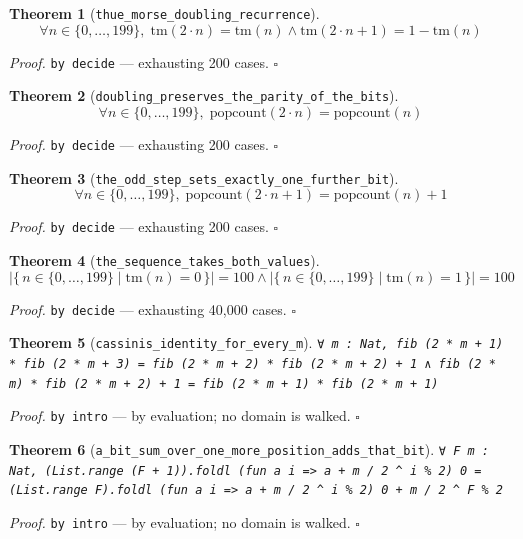\documentclass[11pt]{article}
\newtheorem{theorem}{Theorem}[section]
\begin{document}
\begin{theorem}[\texttt{thue\_morse\_doubling\_recurrence}]
\[ \forall n \in \{0,\dots,199\},\; \mathrm{tm}\mathopen{}\left(2 \cdot n\right) = \mathrm{tm}\mathopen{}\left(n\right) \land \mathrm{tm}\mathopen{}\left(2 \cdot n + 1\right) = 1 - \mathrm{tm}\mathopen{}\left(n\right) \]
\end{theorem}
\noindent\emph{Proof.} \texttt{by decide} --- exhausting 200 cases. \hfill$\square$

\begin{theorem}[\texttt{doubling\_preserves\_the\_parity\_of\_the\_bits}]
\[ \forall n \in \{0,\dots,199\},\; \mathrm{popcount}\mathopen{}\left(2 \cdot n\right) = \mathrm{popcount}\mathopen{}\left(n\right) \]
\end{theorem}
\noindent\emph{Proof.} \texttt{by decide} --- exhausting 200 cases. \hfill$\square$

\begin{theorem}[\texttt{the\_odd\_step\_sets\_exactly\_one\_further\_bit}]
\[ \forall n \in \{0,\dots,199\},\; \mathrm{popcount}\mathopen{}\left(2 \cdot n + 1\right) = \mathrm{popcount}\mathopen{}\left(n\right) + 1 \]
\end{theorem}
\noindent\emph{Proof.} \texttt{by decide} --- exhausting 200 cases. \hfill$\square$

\begin{theorem}[\texttt{the\_sequence\_takes\_both\_values}]
\[ \left|\{\, n \in \{0,\dots,199\} \mid \mathrm{tm}\mathopen{}\left(n\right) = 0 \,\}\right| = 100 \land \left|\{\, n \in \{0,\dots,199\} \mid \mathrm{tm}\mathopen{}\left(n\right) = 1 \,\}\right| = 100 \]
\end{theorem}
\noindent\emph{Proof.} \texttt{by decide} --- exhausting 40,000 cases. \hfill$\square$

\begin{theorem}[\texttt{cassinis\_identity\_for\_every\_m}]
\texttt{∀ m : Nat, fib (2 * m + 1) * fib (2 * m + 3) = fib (2 * m + 2) * fib (2 * m + 2) + 1 ∧ fib (2 * m) * fib (2 * m + 2) + 1 = fib (2 * m + 1) * fib (2 * m + 1)}
\end{theorem}
\noindent\emph{Proof.} \texttt{by
  intro} --- by evaluation; no domain is walked. \hfill$\square$

\begin{theorem}[\texttt{a\_bit\_sum\_over\_one\_more\_position\_adds\_that\_bit}]
\texttt{∀ F m : Nat, (List.range (F + 1)).foldl (fun a i => a + m / 2 ^ i \% 2) 0 = (List.range F).foldl (fun a i => a + m / 2 ^ i \% 2) 0 + m / 2 ^ F \% 2}
\end{theorem}
\noindent\emph{Proof.} \texttt{by
  intro} --- by evaluation; no domain is walked. \hfill$\square$
\end{document}
